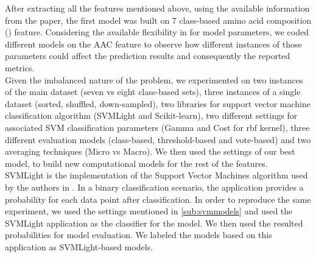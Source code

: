     
    After extracting all the features mentioned above, using the available information from the paper, 
    the first model was built on 7 class-based amino acid composition () feature. Considering the available 
    flexibility in \cite{mishra2014prediction} for model parameters, we coded different models on the AAC feature 
    to observe how different instances of those parameters could affect the prediction results 
    and consequently the reported metrics.\\

    Given the imbalanced nature of the problem, we experimented on 
    two instances of the main dataset (seven vs eight class-based sets),
    three instances of a single dataset (sorted, shuffled, down-sampled),  
    two libraries for support vector machine classification algorithm (SVMLight and Scikit-learn), 
    two different settings for associated SVM classification parameters (Gamma and Cost for rbf kernel), 
    three different evaluation models (class-based, threshold-based and vote-based) and two averaging techniques (Micro vs Macro).
    We then used the settings of our best model, to build new computational models for the rest of the features.\\

    SVMLight is the implementation of the Support Vector Machines algorithm used by the authors in \cite{mishra2014prediction}. 
    In a binary classification scenario, the application provides a probability for each data point after classification. In order 
    to reproduce the same experiment, we used the settings mentioned in \ref{sub:svmmodels} and used the SVMLight application as 
    the classifier for the model. We then used the resulted probabilities for model evaluation. We labeled the models 
    based on this application as SVMLight-based models. \\
    
